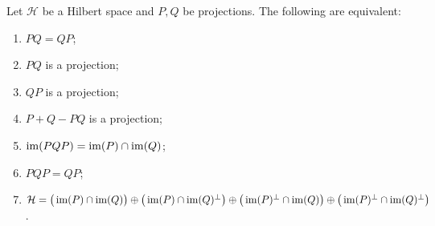 \begin{proposition} \label{lemma:commutingProjectors}
Let $\mathcal{H}$ be a Hilbert space and $P,Q$ be projections. The following are equivalent:
\begin{enumerate}
\item $PQ = QP$;
\item $PQ$ is a projection;
\item $QP$ is a projection;
\item $P+Q-PQ$ is a projection;
\item $\operatorname{im}(PQP) = \operatorname{im}(P) \cap \operatorname{im}(Q)$;
\item $PQP = QP$;
\item $\mathcal{H} = \big(\operatorname{im}(P)\cap\operatorname{im}(Q)\big)\oplus \big(\operatorname{im}(P)\cap\operatorname{im}(Q)^\perp\big) \oplus \big(\operatorname{im}(P)^\perp\cap\operatorname{im}(Q)\big) \oplus \big(\operatorname{im}(P)^\perp\cap\operatorname{im}(Q)^\perp\big)$.
\end{enumerate}
\end{proposition}
